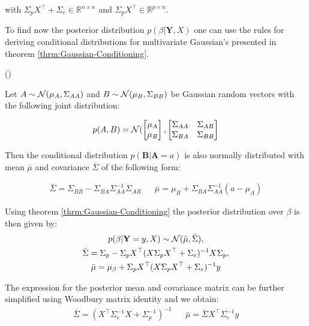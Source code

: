 with $\Sigma_p X^{\top} + \Sigma_e \in \mathbb{R}^{n\times n}$ and $\Sigma_p X^{\top} \in \mathbb{R}^{p\times n}$.

To find now the posterior distribution $p(\beta | \mathbf{Y}, X)$ one can use the rules for deriving conditional
distributions for multivariate Gaussian's presented in theorem \ref{thrm:Gaussian-Conditioning}.

\begin{theorem}\label{thrm:Gaussian-Conditioning} (\citeauthor{von_mises_mathematical_1964})

Let $A \sim \operatorname{\mathcal{N}}(\mu_A, \Sigma_{AA})$ and $B \sim \operatorname{\mathcal{N}}(\mu_B, \Sigma_{BB})$ be
Gaussian random vectors with the following joint distribution:

\begin{gather*}
    p(A, B) = \operatorname{\mathcal{N}}(
    \begin{bmatrix}
        \mu_A \\
        \mu_B
    \end{bmatrix},
    \begin{bmatrix}
        \Sigma_{AA} & \Sigma_{AB} \\
        \Sigma_{BA} & \Sigma_{BB}
    \end{bmatrix}
\end{gather*}

Then the conditional distribution $p(\mathbf{B} | \mathbf{A}=a)$ is also normally distributed
with mean $\bar{\mu}$ and covariance $\bar{\Sigma}$ of the following form:

\begin{align*}
    \bar{\Sigma} = \Sigma_{B B} - \Sigma_{B A} \Sigma_{A A}^{-1} \Sigma_{A B} & & \bar{\mu} = \mu_{B} + \Sigma_{BA} \Sigma_{AA}^{-1}(a - \mu_A)
\end{align*}


\end{theorem}



Using theorem \ref{thrm:Gaussian-Conditioning} the posterior distribution over $\beta$ is then given by:
\begin{gather*}
    p(\beta | \mathbf{Y}=y, X) \sim \operatorname{\mathcal{N}}(\bar{\mu}, \bar{\Sigma}), \\
    \bar{\Sigma} = \Sigma_{p} - \Sigma_p X^{\top}(X \Sigma_p X^{\top} + \Sigma_e)^{-1} X  \Sigma_p, \\
    \bar{\mu} = \mu_{\beta} + \Sigma_p X^{\top}(X \Sigma_p X^{\top} + \Sigma_e)^{-1}y
\end{gather*}

The expression for the posterior mean and covariance matrix can be further simplified using Woodbury matrix identity
and we obtain:
\begin{align}\label{def:conditional-mean-var}
    \bar{\Sigma} = (X^{\top}\Sigma_e^{-1}X + \Sigma_p^{-1})^{-1} & & \bar{\mu} = \bar{\Sigma} X^{\top} \Sigma_e^{-1} y
\end{align}

